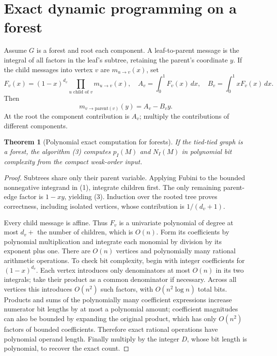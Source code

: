 \documentclass[11pt,a4paper]{article}
\newtheorem{theorem}{Theorem}[section]
\begin{document}
\section{Exact dynamic programming on a forest}
Assume $G$ is a forest and root each component. A leaf-to-parent message is the integral of all factors in the leaf's subtree, retaining the parent's coordinate $y$. If the child messages into vertex $v$ are $m_{u\to v}(x)$, set
\[
 F_v(x)=(1-x)^{d_v}\prod_{u\text{ child of }v}m_{u\to v}(x),
 \quad A_v=\int_0^1F_v(x)\,dx,
 \quad B_v=\int_0^1xF_v(x)\,dx.
\]
Then
\[
 m_{v\to\mathrm{parent}(v)}(y)=A_v-B_vy.                  \tag{3}
\]
At the root the component contribution is $A_v$; multiply the contributions of different components.

\begin{theorem}[Polynomial exact computation for forests]
If the tied-tied graph is a forest, the algorithm (3) computes $p_I(M)$ and $N_I(M)$ in polynomial bit complexity from the compact weak-order input.
\end{theorem}
\begin{proof}
Subtrees share only their parent variable. Applying Fubini to the bounded nonnegative integrand in (1), integrate children first. The only remaining parent-edge factor is $1-xy$, yielding (3). Induction over the rooted tree proves correctness, including isolated vertices, whose contribution is $1/(d_v+1)$.

Every child message is affine. Thus $F_v$ is a univariate polynomial of degree at most $d_v+$ the number of children, which is $O(n)$. Form its coefficients by polynomial multiplication and integrate each monomial by division by its exponent plus one. There are $O(n)$ vertices and polynomially many rational arithmetic operations. To check bit complexity, begin with integer coefficients for $(1-x)^{d_v}$. Each vertex introduces only denominators at most $O(n)$ in its two integrals; take their product as a common denominator if necessary. Across all vertices this introduces $O(n^2)$ such factors, with $O(n^2\log n)$ total bits. Products and sums of the polynomially many coefficient expressions increase numerator bit lengths by at most a polynomial amount; coefficient magnitudes can also be bounded by expanding the original product, which has only $O(n^2)$ factors of bounded coefficients. Therefore exact rational operations have polynomial operand length. Finally multiply by the integer $D$, whose bit length is polynomial, to recover the exact count.
\end{proof}
\end{document}
